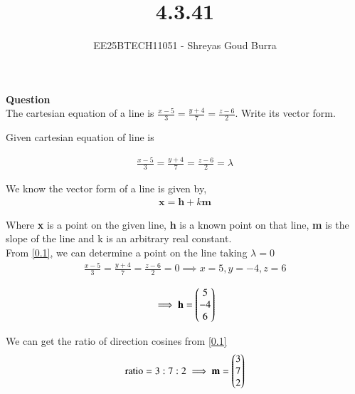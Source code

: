 \documentclass[journal]{IEEEtran}
\begin{document}

\vspace{3cm}

\title{4.3.41}
\author{EE25BTECH11051 - Shreyas Goud Burra}
\maketitle
{\let\newpage\relax\maketitle}

\renewcommand{\thefigure}{\theenumi}
\renewcommand{\thetable}{\theenumi}
\setlength{\intextsep}{10pt}


\renewcommand{\thetable}{\theenumi}

\textbf{Question}\\
The cartesian equation of a line is $\frac{x-5}{3}=\frac{y+4}{7}=\frac{z-6}{2}$. Write its vector form.\\

\solution

Given cartesian equation of line is

\begin{align}
    \frac{x-5}{3}=\frac{y+4}{7}=\frac{z-6}{2}=\lambda
    \label{0.1}
\end{align}

We know the vector form of a line is given by,
\begin{align}
    \textbf{x} = \textbf{h}+k\textbf{m}
    \label{0.2}
\end{align}

Where \textbf{x} is a point on the given line, \textbf{h} is a known point on that line, \textbf{m} is the slope of the line and k is an arbitrary real constant.\\

From \ref{0.1}, we can determine a point on the line taking $\lambda =0$
\begin{align}
    \frac{x-5}{3}=\frac{y+4}{7}=\frac{z-6}{2}=0 \implies x=5, y=-4, z=6
    \label{0.3}
\end{align}

\begin{align}
    \implies \textbf{h} = \begin{pmatrix}5\\-4\\6\end{pmatrix}
    \label{0.4}
\end{align}

We can get the ratio of direction cosines from \ref{0.1}
\begin{align}
    \text{ratio}=3:7:2 \implies \textbf{m} = \begin{pmatrix}3\\7\\2\end{pmatrix}
    \label{0.5}
\end{align}
\end{document}

